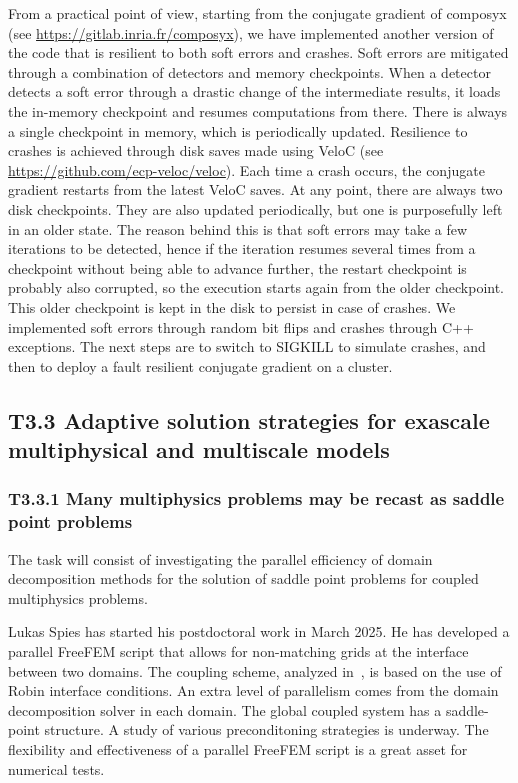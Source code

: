 From a practical point of view, 
starting from the conjugate gradient of composyx (see \url{https://gitlab.inria.fr/composyx}), 
we have implemented another version of the code that is resilient 
to both soft errors and crashes. 
Soft errors are mitigated through a combination of detectors and memory checkpoints. When a detector detects a soft error through a drastic change of the intermediate results, it loads the in-memory checkpoint and resumes computations from there. There is always a single checkpoint in memory, which is periodically updated.
Resilience to crashes is achieved through disk saves made using VeloC (see \url{https://github.com/ecp-veloc/veloc}). Each time a crash occurs, the conjugate gradient restarts from the latest VeloC saves. At any point, there are always two disk checkpoints. They are also updated periodically, but one is purposefully left in an older state. The reason behind this is that soft errors may take a few iterations to be detected, hence if the iteration resumes several times from a checkpoint without being able to advance further, the restart checkpoint is probably also corrupted, so the execution starts again from the older checkpoint. This older checkpoint is kept in the disk to persist in case of crashes.
We implemented soft errors through random bit flips and crashes through C++ exceptions. 
The next steps are to switch to SIGKILL to simulate crashes, and then to deploy 
a fault resilient conjugate gradient on a cluster.


 
 \subsection{ 
T3.3 Adaptive solution strategies for exascale multiphysical and multiscale models
 }

\subsubsection{ 
 T3.3.1 Many multiphysics problems may be recast as saddle point problems
 }
 \label{sec:wp3:T331}
  The task will consist of investigating the parallel efficiency of domain decomposition methods for the solution of saddle point problems for coupled multiphysics problems.

  Lukas Spies has started his postdoctoral work in March 2025. He has developed a parallel FreeFEM script that allows for non-matching grids at the interface between two domains. The coupling scheme, analyzed in~\cite{japhet_robin_2014}, is based on the use of Robin interface conditions. An extra level of parallelism comes from the domain decomposition solver in each domain. The global coupled system has a saddle-point structure. A study of various preconditoning strategies is underway. The flexibility and effectiveness of a parallel FreeFEM script is a great asset for numerical tests. 

